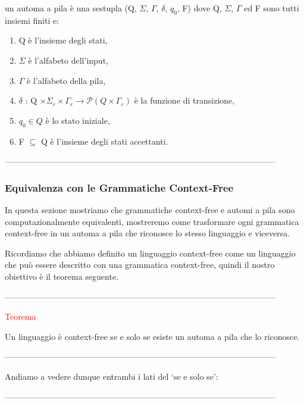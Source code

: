 \documentclass{article}
\begin{document}
un automa a pila è una sestupla (Q, $\Sigma$, $\Gamma$, $\delta$, $q_0$, F) dove
Q, $\Sigma$, $\Gamma$ ed F sono tutti insiemi finiti e:

\begin{enumerate}
    \item Q è l'insieme degli stati,
    \item $\Sigma$ è l'alfabeto dell'input,
    \item $\Gamma$ è l'alfabeto della pila,
    \item $\delta$ : Q $\times \Sigma_\varepsilon \times \Gamma_\varepsilon
    \rightarrow \mathcal{P} (Q \times \Gamma_\varepsilon)$ è la funzione di
    transizione,
    \item $q_0 \in Q$ è lo stato iniziale,
    \item F $\subseteq$ Q è l'insieme degli stati accettanti.
\end{enumerate}

--------------------------------------------------------------------------------------------------

\subsubsection{Equivalenza con le Grammatiche Context-Free}

In questa sezione mostriamo che grammatiche context-free e automi a pila sono
computazionalmente equivalenti, mostreremo come trasformare ogni grammatica
context-free in un automa a pila che riconosce lo stesso linguaggio e viceversa.

Ricordiamo che abbiamo definito un linguaggio context-free come un linguaggio
che può essere descritto con una grammatica context-free, quindi il nostro
obiettivo è il teorema seguente.

--------------------------------------------------------------------------------------------------

\begin{center}
    \textcolor{red}{Teorema}
\end{center}

Un linguaggio è context-free se e solo se esiste un automa a pila che lo
riconosce.

--------------------------------------------------------------------------------------------------

Andiamo a vedere dunque entrambi i lati del `se e solo se':

--------------------------------------------------------------------------------------------------
\end{document}
